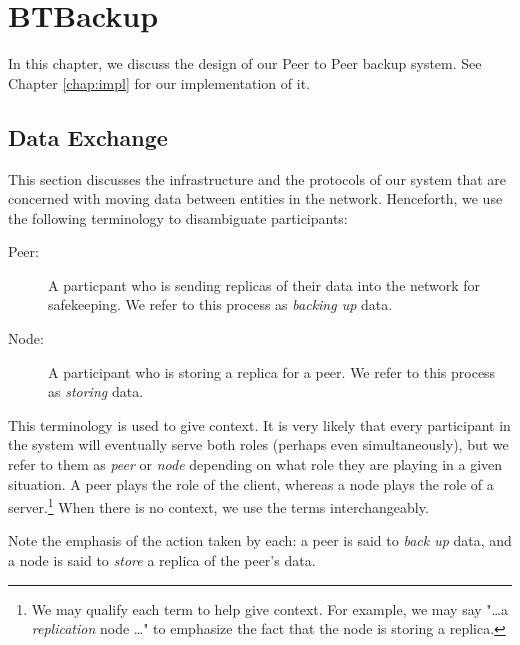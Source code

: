 \documentclass[12pt]{report}
\begin{document}
\chapter{BTBackup}

In this chapter, we discuss the design of our Peer to Peer backup system. See Chapter \ref{chap:impl} for our implementation of it.

\section{Data Exchange} \label{sec:DataExchange}

This section discusses the infrastructure and the protocols of our system that are concerned with moving data between entities in the network. Henceforth, we use the following terminology to disambiguate participants:

\begin{description}
  \item[Peer:] A particpant who is sending replicas of their data into the network for safekeeping. We refer to this process as \textit{backing up} data.
  \item[Node:] A participant who is storing a replica for a peer. We refer to this process as \textit{storing} data.
\end{description}
  
This terminology is used to give context. It is very likely that every participant in the system will eventually serve both roles (perhaps even simultaneously), but we refer to them as \textit{peer} or \textit{node} depending on what role they are playing in a given situation. A peer plays the role of the client, whereas a node plays the role of a server.\footnote{We may qualify each term to help give context. For example, we may say "\ldots a \textit{replication} node \ldots" to emphasize the fact that the node is storing a replica.} When there is no context, we use the terms interchangeably. 

Note the emphasis of the action taken by each: a peer is said to \textit{back up} data, and a node is said to \textit{store} a replica of the peer's data. 
\end{document}
